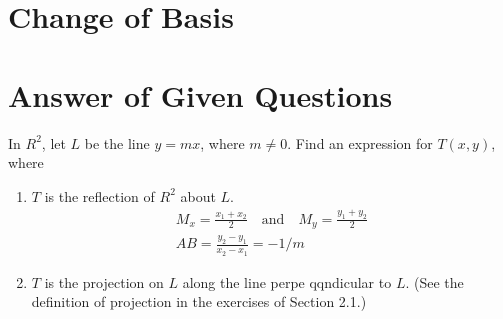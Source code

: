 \documentclass[10pt, oneside]{article}
\begin{document}
\section{Change of Basis}

\section{Answer of Given Questions}

In $R^2$, let $L$ be the line $y = mx$, where $m \neq 0$. Find an expression for $T(x, y)$, where
\begin{enumerate}
	\item $T$ is the reflection of $R^2$ about $L$.
	      \[
		      \begin{split}
			      M_x = \frac{x_1 + x_2}{2} \quad \text{and} \quad M_y = \frac{y_1 + y_2}{2} \\
			      AB = \frac{y_2 - y_1}{x_2 - x_1} = -1/m
		      \end{split}
	      \]
	\item $T$ is the projection on $L$ along the line perpe qqndicular to $L$. (See the definition of projection in the exercises of Section 2.1.)
\end{enumerate}
\end{document}
